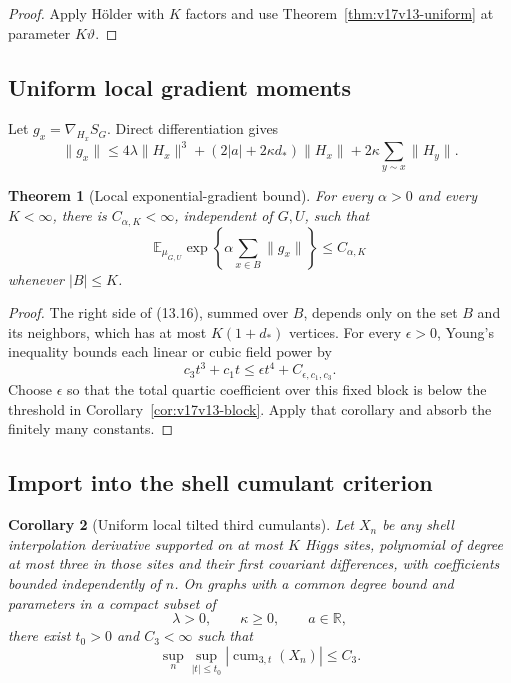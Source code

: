 \documentclass[11pt]{article}
\newtheorem{theorem}{Theorem}[section]
\newtheorem{corollary}[theorem]{Corollary}
\theoremstyle{remark}
\begin{document}
\begin{proof}
Apply H\"older with \(K\) factors and use
Theorem~\ref{thm:v17v13-uniform} at parameter \(K\vartheta\).
\end{proof}

\subsection{Uniform local gradient moments}

Let \(g_x=\nabla_{H_x}S_G\).  Direct differentiation gives
\[
 \|g_x\|
 \leq
 4\lambda\|H_x\|^3
 +(2|a|+2\kappa d_*)\|H_x\|
 +2\kappa\sum_{y\sim x}\|H_y\|.                    \tag{13.16}
\]

\begin{theorem}[Local exponential-gradient bound]
\label{thm:v17v13-local-gradient}
For every \(\alpha>0\) and every \(K<\infty\), there is
\(C_{\alpha,K}<\infty\), independent of \(G,U\), such that
\[
 \mathbb E_{\mu_{G,U}}
 \exp\left\{\alpha\sum_{x\in B}\|g_x\|\right\}
 \leq C_{\alpha,K}                                  \tag{13.17}
\]
whenever \(|B|\leq K\).
\end{theorem}

\begin{proof}
The right side of (13.16), summed over \(B\), depends only on the
set \(B\) and its neighbors, which has at most \(K(1+d_*)\)
vertices.  For every \(\epsilon>0\), Young's inequality bounds each
linear or cubic field power by
\[
 c_3t^3+c_1t\leq\epsilon t^4+C_{\epsilon,c_1,c_3}.                 \tag{13.18}
\]
Choose \(\epsilon\) so that the total quartic coefficient over this
fixed block is below the threshold in
Corollary~\ref{cor:v17v13-block}.  Apply that corollary and absorb
the finitely many constants.
\end{proof}

\subsection{Import into the shell cumulant criterion}

\begin{corollary}[Uniform local tilted third cumulants]
\label{cor:v17v13-cumulant}
Let \(X_{n}\) be any shell interpolation derivative supported on at
most \(K\) Higgs sites, polynomial of degree at most three in those
sites and their first covariant differences, with coefficients
bounded independently of \(n\).  On graphs with a common degree
bound and parameters in a compact subset of
\[
 \lambda>0,\qquad\kappa\geq0,\qquad a\in\mathbb R,
\]
there exist \(t_0>0\) and \(C_3<\infty\) such that
\[
 \sup_n\sup_{|t|\leq t_0}
 \left|\operatorname{cum}_{3,t}(X_n)\right|
 \leq C_3.                                         \tag{13.19}
\]
\end{corollary}
\end{document}
